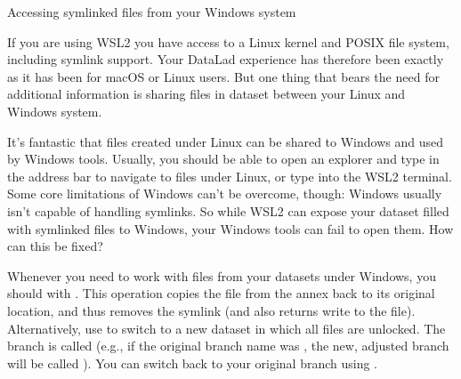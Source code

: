 \ignorespaces \begin{windowswit}[label={ww-wsl2-symlinks}, before title={\thetcbcounter\ }, float, floatplacement=tbp, check odd page=true]{Accessing symlinked files from your Windows system}
\label{\detokenize{basics/101-115-symlinks:ww-wsl2-symlinks}}

\sphinxAtStartPar
If you are using WSL2 you have access to a Linux kernel and POSIX file system, including symlink support.
Your DataLad experience has therefore been exactly as it has been for macOS or Linux users.
But one thing that bears the need for additional information is sharing files in dataset between your Linux and Windows system.

\sphinxAtStartPar
It’s fantastic that files created under Linux can be shared to Windows and used by Windows tools.
Usually, you should be able to open an explorer and type  in the address bar to navigate to files under Linux, or type  into the WSL2 terminal.
Some core limitations of Windows can’t be overcome, though: Windows usually isn’t capable of handling symlinks.
So while WSL2 can expose your dataset filled with symlinked files to Windows, your Windows tools can fail to open them.
How can this be fixed?

\ignorespaces 
\sphinxAtStartPar
Whenever you need to work with files from your datasets under Windows, you should  with .
This operation copies the file from the annex back to its original location, and thus removes the symlink (and also returns write {\hyperref[\detokenize{glossary:term-permissions}]{}} to the file).
Alternatively, use  to switch to a new dataset {\hyperref[\detokenize{glossary:term-branch}]{}} in which all files are unlocked.
The branch is called  (e.g., if the original branch name was , the new, adjusted branch will be called ).
You can switch back to your original branch using .



\end{windowswit}
